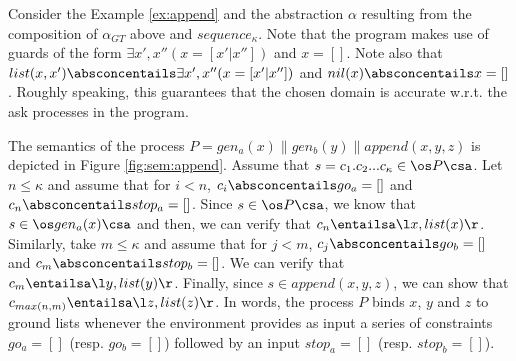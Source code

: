 \documentclass{tlp}
\begin{document}
Consider the Example \ref{ex:append} and the 
abstraction $\alpha$ resulting from the composition of   $\alpha_{GT}$ above and $sequence_{\kappa}$. Note that the program  makes use of guards of the form $\exists x',x'' (x=[x'|x''])$ and $x=[]$. Note also that    $list(x,x') \absconcentails \exists x',x'' (x=[x'|x'']) $ and  $nil(x) \absconcentails x=[]$. Roughly speaking, this guarantees that the chosen domain is accurate w.r.t. the ask processes in the program.   

The semantics of the process $P=gen_a(x) \parallel  gen_b(y) \parallel append(x,y,z)$ is depicted in Figure \ref{fig:sem:append}. Assume that $s= c_1.c_2...c_\kappa \in \os P\csa$. Let
 $n \leq \kappa$ and assume that for  $i<n$,  $c_i \absconcentails go_a=[]$ and $c_n \absconcentails stop_a=[]$. Since $s\in \os P\csa$, we know that $s\in \os gen_a(x) \csa$ and then, we can verify that $c_n \entailsa \l x,list(x)\r$. Similarly, take $m \leq \kappa$ and assume that for  $j<m$,  $c_j \absconcentails go_b=[]$ and $c_m \absconcentails stop_b=[]$. We can verify that 
 $c_m \entailsa \l y,list(y)\r$. Finally, since $s\in append(x,y,z)$, we can show that $c_{max(n,m)} \entailsa \l z,list(z)\r$.  In words, the process $P$ binds $x$, $y$ and $z$ to  ground lists whenever the environment provides as input a series of constraints $go_a=[]$ (resp. $go_b=[]$) followed by an input $stop_a=[]$ (resp.  $stop_b=[]$). 
 
\end{document}
